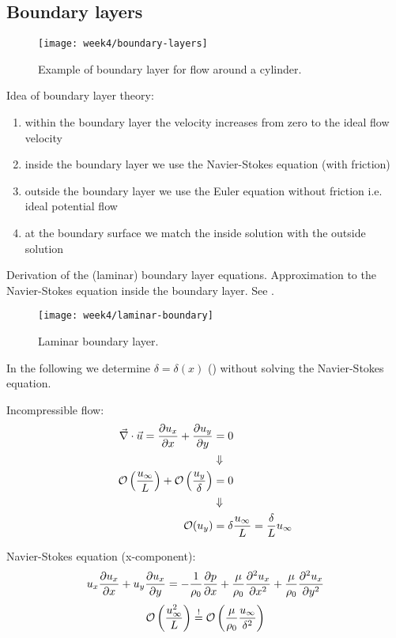 \newpage
\subsection{Boundary layers}

\begin{figure}[ht]
    \centering
    \texttt{[image: week4/boundary-layers]}\\
    \caption{Example of boundary layer for flow around a cylinder.}
    \label{fig:boundary-layers}
\end{figure}

Idea of boundary layer theory:
\begin{enumerate}
\item within the boundary layer the velocity increases from zero to the ideal flow velocity
\item inside the boundary layer we use the Navier-Stokes equation (with friction)
\item outside the boundary layer we use the Euler equation without friction i.e. ideal potential flow
\item at the boundary surface we match the inside solution with the outside solution
\end{enumerate}

Derivation of the (laminar) boundary layer equations. Approximation to the Navier-Stokes equation inside the boundary layer. See .

\begin{figure}[ht]
    \centering
    \texttt{[image: week4/laminar-boundary]}\\
    \caption{Laminar boundary layer.}
    \label{fig:laminar-boundary}
\end{figure}

In the following we determine $\delta = \delta(x)$ () without solving the Navier-Stokes equation.

Incompressible flow:
\begin{align}
\vec{\nabla}\cdot\vec{u} = \frac{\partial u_x}{\partial x} + \frac{\partial u_y}{\partial y} &= 0 \\
&\Downarrow\notag\\
\mathcal{O} \left(\frac{u_\infty}{L}\right) + \mathcal{O} \left(\frac{u_y}{\delta}\right) &= 0\\
&\Downarrow\notag\\
\mathcal{O}(u_y) &= \delta\frac{u_\infty}{L} = \frac{\delta}{L}u_\infty
\end{align}

Navier-Stokes equation (x-component):
\begin{equation}
u_x\frac{\partial u_x}{\partial x} + u_y\frac{\partial u_x}{\partial y} = -\frac{1}{\rho_0}\frac{\partial p}{\partial x} + \frac{\mu}{\rho_0}\frac{\partial^2 u_x}{\partial x^2} + \frac{\mu}{\rho_0}\frac{\partial^2 u_x}{\partial y^2}
\end{equation}
\begin{equation}
\mathcal{O} \left(\frac{u_\infty^2}{L}\right) \overset{!}{=} \mathcal{O} \left(\frac{\mu}{\rho_0}\frac{u_\infty}{\delta^2}\right)
\end{equation}

